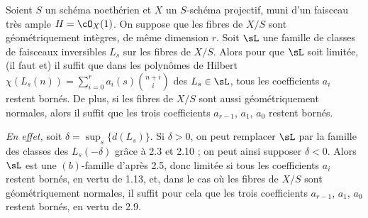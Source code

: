 \begin{lem}\label{lem:2.11} Soient $S$ un schéma noethérien et $X$ un $S$-schéma projectif, muni d'un faisceau très ample $H = \cO_X(1)$. On suppose que les fibres de $X/S$ sont géométriquement intègres, de même dimension $r$. Soit $\sL$ une famille de classes de faisceaux inversibles $L_s$ sur les fibres de $X/S$. Alors pour que $\sL$ soit limitée, (il faut et) il suffit que dans les polynômes de Hilbert $\chi(L_s(n)) = \sum_{i=0}^{r} a_i(s) \binom{n+i}{i}$ des $L_s \in \sL$, tous les coefficients $a_i$ restent bornés. De plus, si les fibres de $X/S$ sont aussi géométriquement normales, alors il suffit que les trois coefficients $a_{r-1}$, $a_1$, $a_0$ restent bornés.
\end{lem}

\noindent\textit{En effet,} soit $\delta = \sup_s \{d(L_s)\}$. Si $\delta > 0$, on peut remplacer $\sL$ par la famille des classes des $L_s(-\delta)$ grâce à 2.3 et 2.10 ; on peut ainsi supposer $\delta < 0$. Alors $\sL$ est une $(b)$-famille d'après 2.5, donc limitée si tous les coefficients $a_i$ restent bornés, en vertu de 1.13, et, dans le cas où les fibres de $X/S$ sont géométriquement normales, il suffit pour cela que les trois coefficients $a_{r-1}$, $a_1$, $a_0$ restent bornés, en vertu de 2.9.

